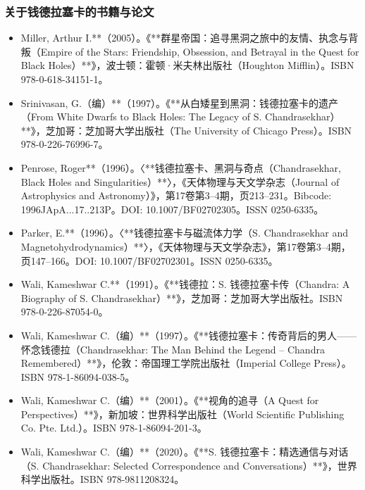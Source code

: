 \subsubsection{关于钱德拉塞卡的书籍与论文}
\begin{itemize}
\item Miller, Arthur I.**（2005）。《**群星帝国：追寻黑洞之旅中的友情、执念与背叛（Empire of the Stars: Friendship, Obsession, and Betrayal in the Quest for Black Holes）**》，波士顿：霍顿·米夫林出版社（Houghton Mifflin）。ISBN 978-0-618-34151-1。

\item Srinivasan, G.（编）**（1997）。《**从白矮星到黑洞：钱德拉塞卡的遗产（From White Dwarfs to Black Holes: The Legacy of S. Chandrasekhar）**》，芝加哥：芝加哥大学出版社（The University of Chicago Press）。ISBN 978-0-226-76996-7。

\item Penrose, Roger**（1996）。〈**钱德拉塞卡、黑洞与奇点（Chandrasekhar, Black Holes and Singularities）**〉，《天体物理与天文学杂志（Journal of Astrophysics and Astronomy）》，第17卷第3–4期，页213–231。Bibcode: 1996JApA...17..213P。DOI: 10.1007/BF02702305。ISSN 0250-6335。

\item Parker, E.**（1996）。〈**钱德拉塞卡与磁流体力学（S. Chandrasekhar and Magnetohydrodynamics）**〉，《天体物理与天文学杂志》，第17卷第3–4期，页147–166。DOI: 10.1007/BF02702301。ISSN 0250-6335。

\item Wali, Kameshwar C.**（1991）。《**钱德拉：S. 钱德拉塞卡传（Chandra: A Biography of S. Chandrasekhar）**》，芝加哥：芝加哥大学出版社。ISBN 978-0-226-87054-0。

\item Wali, Kameshwar C.（编）**（1997）。《**钱德拉塞卡：传奇背后的男人——怀念钱德拉（Chandrasekhar: The Man Behind the Legend – Chandra Remembered）**》，伦敦：帝国理工学院出版社（Imperial College Press）。ISBN 978-1-86094-038-5。

\item Wali, Kameshwar C.（编）**（2001）。《**视角的追寻（A Quest for Perspectives）**》，新加坡：世界科学出版社（World Scientific Publishing Co. Pte. Ltd.）。ISBN 978-1-86094-201-3。

\item Wali, Kameshwar C.（编）**（2020）。《**S. 钱德拉塞卡：精选通信与对话（S. Chandrasekhar: Selected Correspondence and Conversations）**》，世界科学出版社。ISBN 978-9811208324。


\end{itemize}
